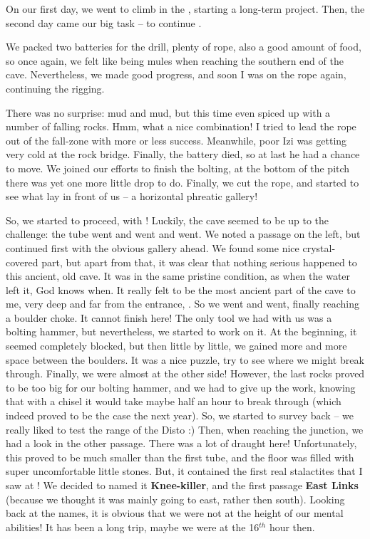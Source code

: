 On our first day, we went to climb in the ,
starting a long-term project. Then, the second day came our big task --
to continue .

We packed two batteries for the drill, plenty of rope, also a good
amount of food, so once again, we felt like being mules when reaching
the southern end of the cave. Nevertheless, we made good progress, and
soon I was on the rope again, continuing the rigging.

There was no surprise: mud and mud, but this time even spiced up with a
number of falling rocks. Hmm, what a nice combination! I tried to lead
the rope out of the fall-zone with more or less success. Meanwhile, poor
Izi was getting very cold at the rock bridge. Finally, the battery died,
so at last he had a chance to move. We joined our efforts to finish the
bolting, at the bottom of the pitch there was yet one more little drop
to do. Finally, we cut the rope, and started to see what lay in front of
us -- a horizontal phreatic gallery!

So, we started to proceed, with ! Luckily, the cave seemed to be up to the
challenge: the tube went and went and went. We noted a passage on the
left, but continued first with the obvious gallery ahead. We found some
nice crystal-covered part, but apart from that, it was clear that
nothing serious happened to this ancient, old cave. It was in the same
pristine condition, as when the water left it, God knows when. It really
felt to be the most ancient part of the cave to me, very deep and far
from the entrance, . So we went and
went, finally reaching a boulder choke. It cannot finish here! The only
tool we had with us was a bolting hammer, but nevertheless, we started
to work on it. At the beginning, it seemed completely blocked, but then
little by little, we gained more and more space between the boulders. It
was a nice puzzle, try to see where we might break through. Finally, we
were almost at the other side! However, the last rocks proved to be too
big for our bolting hammer, and we had to give up the work, knowing that
with a chisel it would take maybe half an hour to break through (which
indeed proved to be the case the next year). So, we started to survey
back -- we really liked to test the range of the Disto :) Then, when
reaching the junction, we had a look in the other passage. There was a
lot of draught here! Unfortunately, this proved to be much smaller than
the first tube, and the floor was filled with super uncomfortable little
stones. But, it contained the first real stalactites that I saw at !
We decided to named it \textbf{Knee-killer}, and the first passage
\textbf{East Links} (because we thought it was mainly going to east,
rather then south). Looking back at the names, it is obvious that we
were not at the height of our mental abilities! It has been a long trip,
maybe we were at the 16\(^{th}\) hour then.


